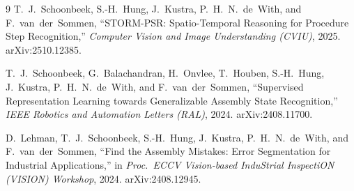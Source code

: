 \documentclass[11pt,a4paper]{article}
\begin{document}
\begin{thebibliography}{9}
T.~J.~Schoonbeek, S.-H.~Hung, J.~Kustra, P.~H.~N.~de~With, and F.~van~der~Sommen,
``STORM-PSR: Spatio-Temporal Reasoning for Procedure Step Recognition,''
\emph{Computer Vision and Image Understanding (CVIU)}, 2025.
arXiv:2510.12385.

T.~J.~Schoonbeek, G.~Balachandran, H.~Onvlee, T.~Houben, S.-H.~Hung, J.~Kustra,
P.~H.~N.~de~With, and F.~van~der~Sommen,
``Supervised Representation Learning towards Generalizable Assembly State Recognition,''
\emph{IEEE Robotics and Automation Letters (RAL)}, 2024.
arXiv:2408.11700.

D.~Lehman, T.~J.~Schoonbeek, S.-H.~Hung, J.~Kustra, P.~H.~N.~de~With, and F.~van~der~Sommen,
``Find the Assembly Mistakes: Error Segmentation for Industrial Applications,''
in \emph{Proc.\ ECCV Vision-based InduStrial InspectiON (VISION) Workshop}, 2024.
arXiv:2408.12945.

\end{thebibliography}
\end{document}
